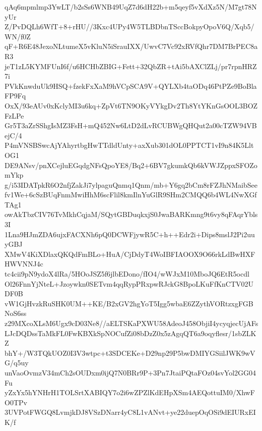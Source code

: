 qAq6mpmlmp3YwLT/b2sSs6WNB49UqZ7d6dH22b+m5qeyf5vXdXz5N/M7gt78NyUr
Z/PvDQLh6WfT+8+rHU//3Kxc4UPy4W5TLBDbnTSccBokpyOpoV6Q/Xqb5/WN/f0Z
qF+R6E48JexoNLtumeX5vKluN5iSrauIXX/UwvC7Vc92xRVfQhr7DM7BrPEC8aR3
jeT1zL5KYMFUnI6f/u6HCHbZBIG+Fett+32QbZR+tAi5bAXClZLj/pr7rpnHRZ7i
PVkKnwduUk9HSQ+fzekFxXaM9hVCpSCA9V+QYLXb4taODq46PtPZe9BoBlaFP9Fq
OxX/93eAUv0xKclyMI3u6kq+ZpVt6TN9OKyVYkgDv2Th8YtYKnGsOOL3BOZFzLPe
Gr5T3aZrSShgIsMZ3FsH+mQ452Nw6LtD2dLvRCUBWgQHQut2a00cTZW94VBejC/4
P4mVNSBSwcAjYAhyrtbgHwTTdldUnty+axXub301dOL0PPTCT1vI9n84K5LltOG1
DE9ANsv/pnXCejluEGqdgNFsQpoYE8/Bq2+6BV7gkumkQb6kVWJZppxSFOZomYkp
g/i53IDATpkR6O2nfjZakJi7ylpaguQnmq1Qnm/mb+Y6gq2bCm8rFZJhNMaibSee
fv1We+6cSzBUqFnmMwiHhM6scFlil8kmIlnYuGlR9SHm2CMQQ6b4WL4NwXGfTAg1
owAkTbzCIV76TvMkhCqjaM/SQytGBDuqkxjS0JwaBARKmng9t6vy8qFAqrYbls3I
1Lna9HJmZDA6ujxFACXNh6pQ0DCWFjywR5C+h++Edr2i+Dips8mslJ2Pi2uuyGBJ
XMwV4KiXDlaxQKQdFmBLo+HuA/CjDdyT4WoIBFIAOOX9O66rkLdBwHXFHWVNNJ4c
tc4cii9pN9ydoX4lRa/5HOoJSZ5f6jlbEDono/fIO4/wWJxM10MboJQ6EtR5ocdl
Ol26FnnYjNteL+Jzoywkn0SETvm4qqRypPRxpwRJckG8BpoLKuFfKnCTV02UDF0B
vW1GjHvzkRuSHK0UM++KE/B2xGV2hgYoT5Igg5wbaE6ZZythVORtzxgFGBNoS6ss
z29MXcoXLsM6Ugx9cD03Ne8//aELTSKaPXWU58AdeoJ458ObjiI4ycyqjecUjAFs
LJcDQDssTaMkFL0FwKBXkSpNOCufZi08bDzZ0x5zAgqQT6a9oqyflesr/1sbZLKZ
bhY+/W3TQkUOZ0I3V3wtpc+t3SDCEKe+D29np29P5bwDMIYGSiilJWK9wVG/q5uy
unVaoOvmzV34mCh2sOUDxm0ijQ7N0BRr9P+3Pn7JtaiPQtaFOz04svYol2GG04Fu
yZxYx5hYNHrH1TOLSrtXABIQY7o2i6wZPZlKdEHpXSm4AEQottuIM0/XhwFO0TPv
3UVPotFWGQ8LvmjkDJ8VSzDNarr4yC8L1vANvt+ye22duepOqOSi9dEIURxEIK/f
